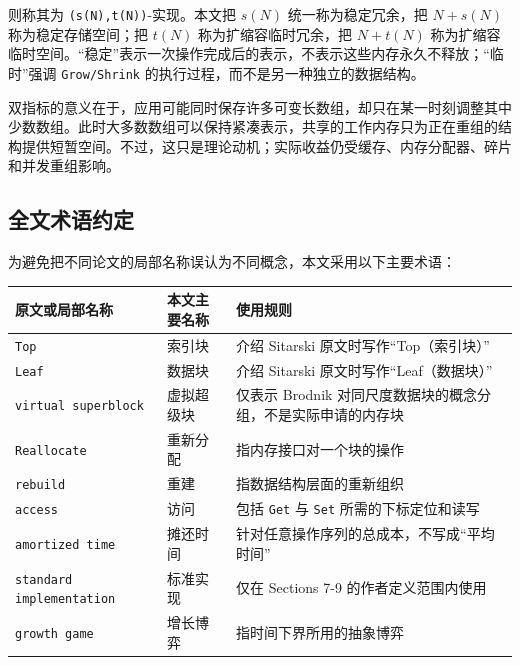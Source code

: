 \documentclass[UTF8,11pt,a4paper]{ctexart}
\begin{document}
则称其为 \textnormal{\texttt{(s(N),t(N))}}-实现。本文把 $s(N)$ 统一称为稳定冗余，把 $N+s(N)$ 称为稳定存储空间；把 $t(N)$ 称为扩缩容临时冗余，把 $N+t(N)$ 称为扩缩容临时空间。“稳定”表示一次操作完成后的表示，不表示这些内存永久不释放；“临时”强调 \textnormal{\texttt{Grow/Shrink}} 的执行过程，而不是另一种独立的数据结构。\par

双指标的意义在于，应用可能同时保存许多可变长数组，却只在某一时刻调整其中少数数组。此时大多数数组可以保持紧凑表示，共享的工作内存只为正在重组的结构提供短暂空间。不过，这只是理论动机；实际收益仍受缓存、内存分配器、碎片和并发重组影响。\par

\subsection{全文术语约定}

为避免把不同论文的局部名称误认为不同概念，本文采用以下主要术语：\par

\begin{center}
\small
\begin{tabularx}{\textwidth}{@{}>{\raggedright\arraybackslash}X>{\raggedright\arraybackslash}X>{\raggedright\arraybackslash}X@{}}
\toprule
\textbf{原文或局部名称} & \textbf{本文主要名称} & \textbf{使用规则} \\
\midrule
\textnormal{\texttt{Top}} & 索引块 & 介绍 Sitarski 原文时写作“Top（索引块）” \\
\textnormal{\texttt{Leaf}} & 数据块 & 介绍 Sitarski 原文时写作“Leaf（数据块）” \\
\textnormal{\texttt{virtual superblock}} & 虚拟超级块 & 仅表示 Brodnik 对同尺度数据块的概念分组，不是实际申请的内存块 \\
\textnormal{\texttt{Reallocate}} & 重新分配 & 指内存接口对一个块的操作 \\
\textnormal{\texttt{rebuild}} & 重建 & 指数据结构层面的重新组织 \\
\textnormal{\texttt{access}} & 访问 & 包括 \textnormal{\texttt{Get}} 与 \textnormal{\texttt{Set}} 所需的下标定位和读写 \\
\textnormal{\texttt{amortized time}} & 摊还时间 & 针对任意操作序列的总成本，不写成“平均时间” \\
\textnormal{\texttt{standard implementation}} & 标准实现 & 仅在 Sections 7-9 的作者定义范围内使用 \\
\textnormal{\texttt{growth game}} & 增长博弈 & 指时间下界所用的抽象博弈 \\
\bottomrule
\end{tabularx}
\end{center}
\end{document}
